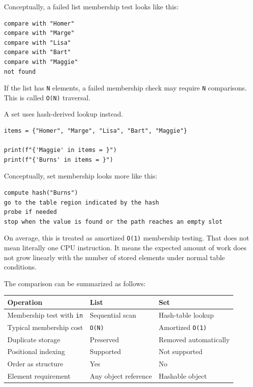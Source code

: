 Conceptually, a failed list membership test looks like this:

\begin{verbatim}
compare with "Homer"
compare with "Marge"
compare with "Lisa"
compare with "Bart"
compare with "Maggie"
not found
\end{verbatim}

If the list has \texttt{N} elements, a failed membership check may require \texttt{N} comparisons. This is called \texttt{O(N)} traversal.

A set uses hash-derived lookup instead.

\begin{verbatim}
items = {"Homer", "Marge", "Lisa", "Bart", "Maggie"}

print(f"{'Maggie' in items = }")
print(f"{'Burns' in items = }")
\end{verbatim}

Conceptually, set membership looks more like this:

\begin{verbatim}
compute hash("Burns")
go to the table region indicated by the hash
probe if needed
stop when the value is found or the path reaches an empty slot
\end{verbatim}

On average, this is treated as amortized \texttt{O(1)} membership testing. That does not mean literally one CPU instruction. It means the expected amount of work does not grow linearly with the number of stored elements under normal table conditions.

The comparison can be summarized as follows:

\begin{center}
\begin{tabular}{lll}
\textbf{Operation} & \textbf{List} & \textbf{Set} \\
\hline
Membership test with \texttt{in} & Sequential scan & Hash-table lookup \\
Typical membership cost & \texttt{O(N)} & Amortized \texttt{O(1)} \\
Duplicate storage & Preserved & Removed automatically \\
Positional indexing & Supported & Not supported \\
Order as structure & Yes & No \\
Element requirement & Any object reference & Hashable object \\
\end{tabular}
\end{center}

